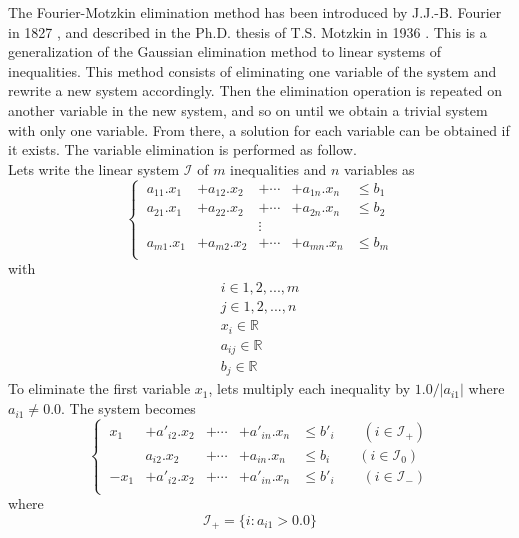 \documentclass[12pt, a4paper]{article}
\begin{document}
The Fourier-Motzkin elimination method has been introduced by J.J.-B. Fourier in 1827 \cite{fourier}, and described in the Ph.D. thesis of T.S. Motzkin in 1936 \cite{motzkin}. This is a generalization of the Gaussian elimination method to linear systems of inequalities. This method consists of eliminating one variable of the system and rewrite a new system accordingly. Then the elimination operation is repeated on another variable in the new system, and so on until we obtain a trivial system with only one variable. From there, a solution for each variable can be obtained if it exists. The variable elimination is performed as follow.\\
Lets write the linear system $\mathcal{I}$ of $m$ inequalities and $n$ variables as 
\begin{equation}
\left\{\
\begin{array}{ccccc}
a_{11}.x_1&+a_{12}.x_2&+\cdots&+a_{1n}.x_n &\le b_1\\
a_{21}.x_1&+a_{22}.x_2&+\cdots&+a_{2n}.x_n &\le b_2\\
&&\vdots&&\\
a_{m1}.x_1&+a_{m2}.x_2&+\cdots&+a_{mn}.x_n &\le b_m\\
\end{array}
\right.
\end{equation}
with
\begin{equation}
\begin{array}{c}
i\in{1, 2, ..., m}\\
j\in{1, 2, ..., n}\\
x_i\in\mathbb{R}\\
a_{ij}\in\mathbb{R}\\
b_j\in\mathbb{R} 
\end{array}
\end{equation}
To eliminate the first variable $x_1$, lets multiply each inequality by $1.0/|a_{i1}|$ where $a_{i1}\not=0.0$. The system becomes
\begin{equation}
\label{eqn_elim_system}
\left\{\
\begin{array}{ccccc}
x_1&+a'_{i2}.x_2&+\cdots&+a'_{in}.x_n &\le b'_i\qquad(i\in\mathcal{I}_+)\\
&a_{i2}.x_2&+\cdots&+a_{in}.x_n &\le b_i\qquad(i\in\mathcal{I}_0)\\
-x_1&+a'_{i2}.x_2&+\cdots&+a'_{in}.x_n &\le b'_i\qquad(i\in\mathcal{I}_-)\\
\end{array}
\right.
\end{equation}
where 
$$\mathcal{I}_+=\{i:a_{i1}>0.0\}$$
\end{document}
